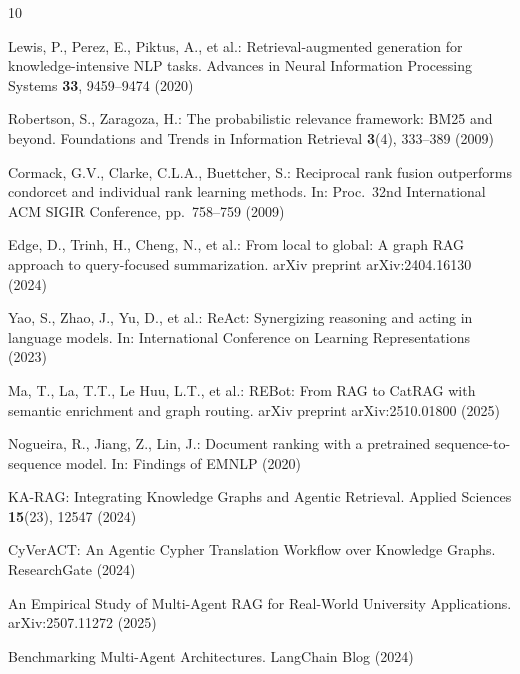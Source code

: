 \documentclass[runningheads]{llncs}
\begin{document}
\begin{thebibliography}{10}

Lewis, P., Perez, E., Piktus, A., et al.:
Retrieval-augmented generation for knowledge-intensive NLP tasks.
Advances in Neural Information Processing Systems \textbf{33}, 9459--9474 (2020)

Robertson, S., Zaragoza, H.:
The probabilistic relevance framework: BM25 and beyond.
Foundations and Trends in Information Retrieval \textbf{3}(4), 333--389 (2009)

Cormack, G.V., Clarke, C.L.A., Buettcher, S.:
Reciprocal rank fusion outperforms condorcet and individual rank learning methods.
In: Proc.\ 32nd International ACM SIGIR Conference, pp.~758--759 (2009)

Edge, D., Trinh, H., Cheng, N., et al.:
From local to global: A graph RAG approach to query-focused summarization.
arXiv preprint arXiv:2404.16130 (2024)

Yao, S., Zhao, J., Yu, D., et al.:
ReAct: Synergizing reasoning and acting in language models.
In: International Conference on Learning Representations (2023)

Ma, T., La, T.T., Le Huu, L.T., et al.:
REBot: From RAG to CatRAG with semantic enrichment and graph routing.
arXiv preprint arXiv:2510.01800 (2025)

Nogueira, R., Jiang, Z., Lin, J.:
Document ranking with a pretrained sequence-to-sequence model.
In: Findings of EMNLP (2020)

KA-RAG: Integrating Knowledge Graphs and Agentic Retrieval.
Applied Sciences \textbf{15}(23), 12547 (2024)

CyVerACT: An Agentic Cypher Translation Workflow over Knowledge Graphs.
ResearchGate (2024)

An Empirical Study of Multi-Agent RAG for Real-World University Applications.
arXiv:2507.11272 (2025)

Benchmarking Multi-Agent Architectures.
LangChain Blog (2024)

\end{thebibliography}
\end{document}
